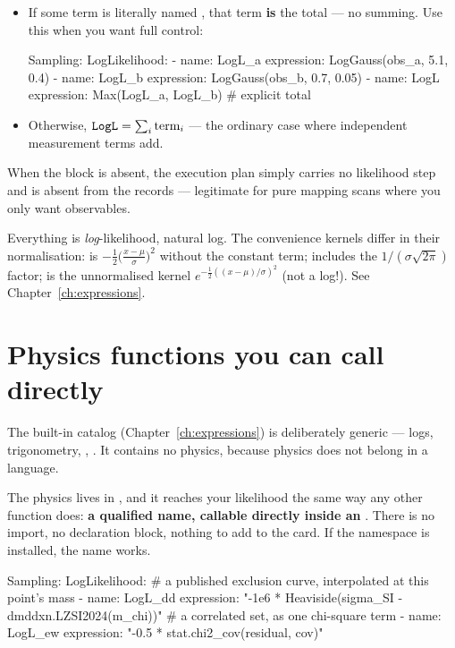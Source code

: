 \begin{itemize}
  \item If some term is literally named , that term \textbf{is} the total ---
        no summing. Use this when you want full control:
\begin{yamlwin}
Sampling:
  LogLikelihood:
    - name: LogL_a
      expression: LogGauss(obs_a, 5.1, 0.4)
    - name: LogL_b
      expression: LogGauss(obs_b, 0.7, 0.05)
    - name: LogL
      expression: Max(LogL_a, LogL_b)   # explicit total
\end{yamlwin}
  \item Otherwise, $\code{LogL} = \sum_i \text{term}_i$ --- the ordinary case where
        independent measurement terms add.
\end{itemize}

When the block is absent, the execution plan simply carries no likelihood
step and  is absent from the records --- legitimate for pure mapping scans
where you only want observables.

\begin{jnote}
Everything is \emph{log}-likelihood, natural log. The convenience kernels differ in their
normalisation:  is
$-\tfrac{1}{2}\big(\tfrac{x-\mu}{\sigma}\big)^2$ without the constant term;
 includes the $1/(\sigma\sqrt{2\pi})$ factor;  is the
unnormalised kernel $e^{-\frac{1}{2}((x-\mu)/\sigma)^2}$ (not a log!). See
Chapter~\ref{ch:expressions}.
\end{jnote}

\section{Physics functions you can call directly}
\label{sec:likelihood-operas}

The built-in catalog (Chapter~\ref{ch:expressions}) is deliberately generic --- logs,
trigonometry, , . It contains no physics, because physics
does not belong in a language.

The physics lives in \Operas, and it reaches your likelihood the same way any other
function does: \textbf{a qualified name, callable directly inside an
}. There is no import, no declaration block, nothing to add to the
card. If the namespace is installed, the name works.

\begin{yamlwin}
Sampling:
  LogLikelihood:
    # a published exclusion curve, interpolated at this point's mass
    - name: LogL_dd
      expression: "-1e6 * Heaviside(sigma_SI
                   - dmddxn.LZSI2024(m_chi))"
    # a correlated set, as one chi-square term
    - name: LogL_ew
      expression: "-0.5 * stat.chi2_cov(residual, cov)"
\end{yamlwin}

